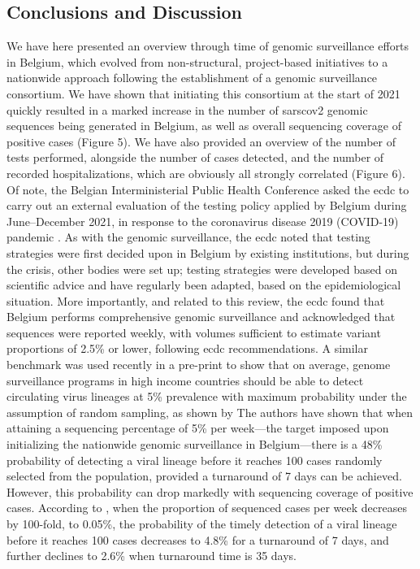 \subsection{Conclusions and Discussion}
We have here presented an overview through time of genomic surveillance efforts in Belgium, which evolved from non-structural, project-based initiatives to a nationwide approach following the establishment of a genomic surveillance consortium.
We have shown that initiating this consortium at the start of 2021 quickly resulted in a marked increase in the number of \gls{sarscov2} genomic sequences being generated in Belgium, as well as overall sequencing coverage of positive cases (Figure 5).
We have also provided an overview of the number of tests performed, alongside the number of cases detected, and the number of recorded hospitalizations, which are obviously all strongly correlated (Figure 6).
Of note, the Belgian Interministerial Public Health Conference asked the \gls{ecdc} to carry out an external evaluation of the testing policy applied by Belgium during June--December 2021, in response to the coronavirus disease 2019 (COVID-19) pandemic \citep{ecdcBelgiumTesting}.
As with the genomic surveillance, the \gls{ecdc} noted that testing strategies were first decided upon in Belgium by existing institutions, but during the crisis, other bodies were set up; testing strategies were developed based on scientific advice and have regularly been adapted, based on the epidemiological situation.
More importantly, and related to this review, the \gls{ecdc} found that Belgium performs comprehensive genomic surveillance and acknowledged that sequences were reported weekly, with volumes sufficient to estimate variant proportions of 2.5\% or lower, following \gls{ecdc} recommendations.
A similar benchmark was used recently in a pre-print to show that on average, genome surveillance programs in high income countries should be able to detect circulating virus lineages at 5\% prevalence with maximum probability under the assumption of random sampling, as shown by \citet{brito2022global} The authors have shown that when attaining a sequencing percentage of 5\% per week—the target imposed upon initializing the nationwide genomic surveillance in Belgium—there is a 48\% probability of detecting a viral lineage before it reaches 100 cases randomly selected from the population, provided a turnaround of 7 days can be achieved.
However, this probability can drop markedly with sequencing coverage of positive cases.
According to \citet{brito2022global}, when the proportion of sequenced cases per week decreases by 100-fold, to 0.05\%, the probability of the timely detection of a viral lineage before it reaches 100 cases decreases to 4.8\% for a turnaround of 7 days, and further declines to 2.6\% when turnaround time is 35 days.
